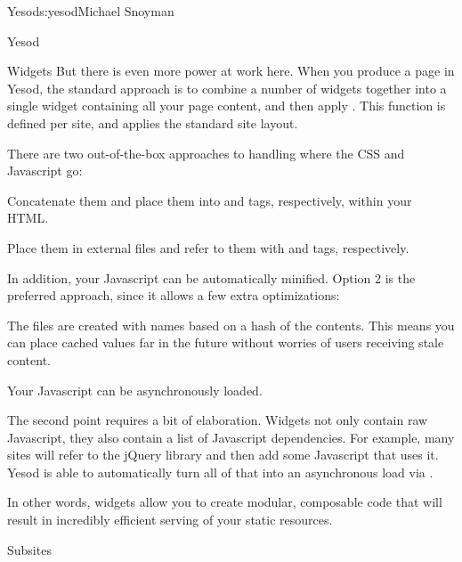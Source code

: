 \begin{aosachapter}{Yesod}{s:yesod}{Michael Snoyman}
\begin{aosasect1}{Yesod}
\begin{aosasect2}{Widgets}
But there is even more power at work here. When you produce a page in
Yesod, the standard approach is to combine a number of widgets
together into a single widget containing all your page content, and
then apply . This function is defined per site, and
applies the standard site layout.

There are two out-of-the-box approaches to handling where the CSS and
Javascript go:

\begin{aosaenumerate}

\item Concatenate them and place them into  and
   tags, respectively, within your HTML.

\item Place them in external files and refer to them with 
  and  tags, respectively.
 
\end{aosaenumerate}

In addition, your Javascript can be automatically minified. Option 2
is the preferred approach, since it allows a few extra optimizations:

\begin{aosaenumerate}
 
\item The files are created with names based on a hash of the
  contents. This means you can place cached values far in the future
  without worries of users receiving stale content.
 
\item Your Javascript can be asynchronously loaded.
 
\end{aosaenumerate}

The second point requires a bit of elaboration. Widgets not only
contain raw Javascript, they also contain a list of Javascript
dependencies. For example, many sites will refer to the jQuery library
and then add some Javascript that uses it. Yesod is able to
automatically turn all of that into an asynchronous load via
.

In other words, widgets allow you to create modular, composable code
that will result in incredibly efficient serving of your static
resources.

\end{aosasect2}

\begin{aosasect2}{Subsites}


\end{aosasect2}
\end{aosasect1}
\end{aosachapter}
